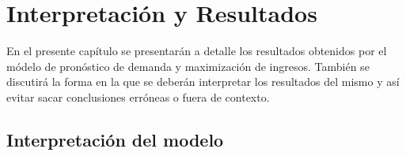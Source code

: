 \chapter{Interpretación y Resultados}
\label{ch:results}

En el presente capítulo se presentarán a detalle los resultados obtenidos por el módelo de pronóstico de demanda y maximización de ingresos. También se discutirá la forma en la que se deberán interpretar los resultados del mismo y así evitar sacar conclusiones erróneas o fuera de contexto.

\section*{Interpretación del modelo}

